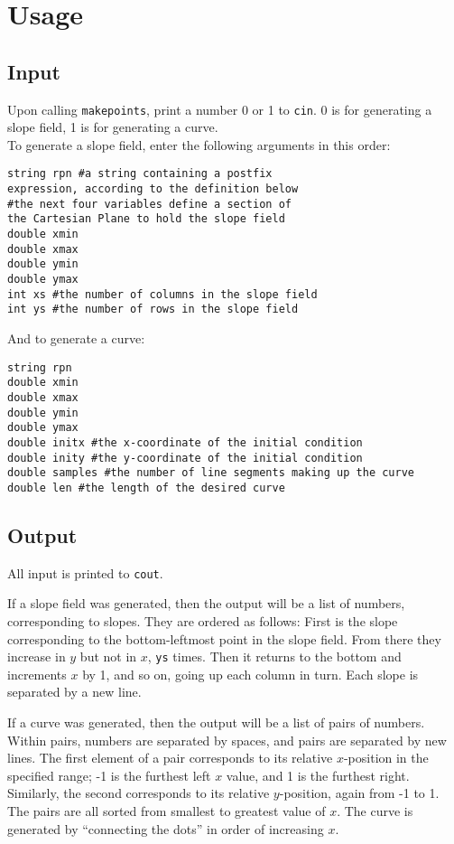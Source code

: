 \documentclass{article}
\begin{document}
\section{Usage}
\subsection{Input}

Upon calling \lstinline{makepoints}, print a number 0 or 1 to \lstinline{cin}. 0 is for generating a slope field, 1 is for generating a curve.\\
To generate a slope field, enter the following arguments in this order:

\begin{verbatim}
string rpn #a string containing a postfix
expression, according to the definition below
#the next four variables define a section of
the Cartesian Plane to hold the slope field
double xmin
double xmax
double ymin
double ymax
int xs #the number of columns in the slope field
int ys #the number of rows in the slope field
\end{verbatim}

And to generate a curve:
\begin{verbatim}
string rpn
double xmin
double xmax
double ymin
double ymax
double initx #the x-coordinate of the initial condition
double inity #the y-coordinate of the initial condition
double samples #the number of line segments making up the curve
double len #the length of the desired curve
\end{verbatim}
\subsection{Output}
All input is printed to \lstinline{cout}.

If a slope field was generated, then the output will be a list of numbers, corresponding to slopes. They are ordered as follows: First is the slope corresponding to the bottom-leftmost point in the slope field. From there they increase in $y$ but not in $x$, \lstinline{ys} times. Then it returns to the bottom and increments $x$ by 1, and so on, going up each column in turn. Each slope is separated by a new line.

If a curve was generated, then the output will be a list of pairs of numbers. Within pairs, numbers are separated by spaces, and pairs are separated by new lines. The first element of a pair corresponds to its relative $x$-position in the specified range; -1 is the furthest left $x$ value, and 1 is the furthest right. Similarly, the second corresponds to its relative $y$-position, again from -1 to 1. The pairs are all sorted from smallest to greatest value of $x$. The curve is generated by ``connecting the dots'' in order of increasing $x$.
\end{document}
